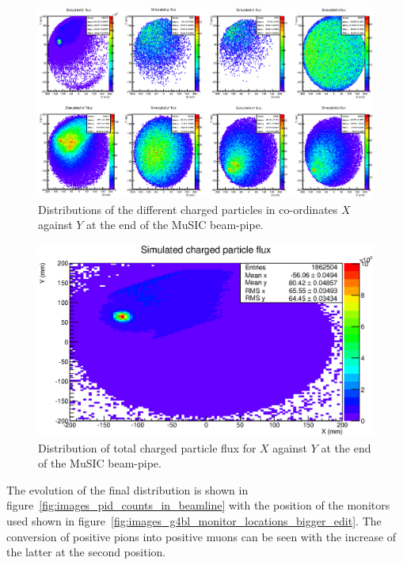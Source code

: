 \begin{figure}
  \centering
    \includegraphics[width=.9\textwidth]{images/sim_2d_per_pid_flux.eps}
  \caption{Distributions of the different charged particles in co-ordinates \(X\) against \(Y\) at the end of the MuSIC beam-pipe.}
  \label{fig:images_sim_2d_per_pid_flux}
\end{figure}

\begin{figure}[hptb]
  \centering
  \includegraphics[width=.9\textwidth]{images/sim_2d_charged_particle_flux.eps}
  \caption{Distribution of total charged particle flux for \(X\) against \(Y\) at the end of the MuSIC beam-pipe.}
  \label{fig:images_sim_2d_charged_particle_flux}
\end{figure}
\clearpage

The evolution of the final distribution is shown in figure~\ref{fig:images_pid_counts_in_beamline} with the position of the monitors used shown in figure~\ref{fig:images_g4bl_monitor_locations_bigger_edit}. The conversion of positive pions into positive muons can be seen with the increase of the latter at the second position.

